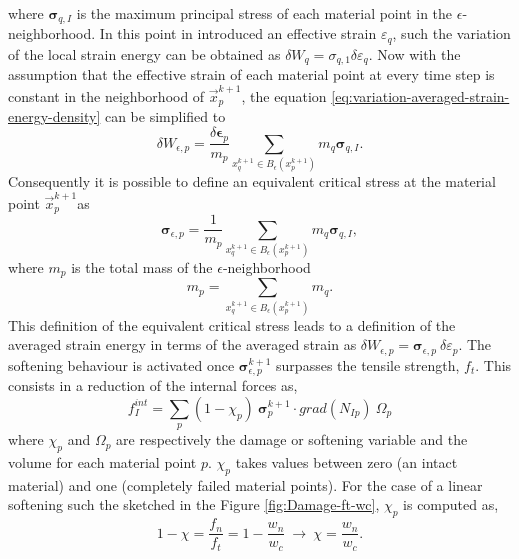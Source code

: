 \message{ !name(2020_EFM_MPM_Eigensoftening.tex)}\documentclass[preprint,12pt,a4paper]{elsarticle}
\newcommand{\tens}[1]{
  \ensuremath{\mathbf{{#1}}}
}
\newcommand\Grad[1]{grad({#1})}
\begin{document}
where $\tens{\sigma}_{q,I}$ is the maximum principal stress of each
material point in the $\epsilon$-neighborhood. In this point in
introduced an effective strain $\varepsilon_q$, such the variation of
the local strain energy can be obtained as $\delta W_q = \sigma_{q,1}
\delta\varepsilon_q$. Now with the assumption that the effective
strain of each material point at every time step is constant in the
neighborhood of $\vec{x}_p^{k+1}$, the equation 
\eqref{eq:variation-averaged-strain-energy-density} can be simplified
 to
\begin{equation}
  \label{eq:variation-averaged-strain-energy-density-simpli}
  \delta W_{\epsilon,p} =
  \frac{\delta \tens{\epsilon}_p}{m_p} \sum_{x_q^{k+1} \in
  B_{\epsilon}(x_p^{k+1})} m_q \tens{\sigma}_{q,I}. 
\end{equation}
Consequently it is possible to define an equivalent critical stress at the
material point $\vec{x}_p^{k+1}$as
\begin{equation}
  \label{eq:equivalent-critical-stress}
  \tens{\sigma}_{\epsilon,p} =
  \frac{1}{m_p} \sum_{x_q^{k+1} \in
  B_{\epsilon}(x_p^{k+1})} m_q \tens{\sigma}_{q,I}, 
\end{equation}
where $m_p$ is the total mass of the $\epsilon$-neighborhood
\begin{equation}
  \label{eq:averaged-mass}
  m_p = \sum_{x_q^{k+1} \in B_{\epsilon}(x_p^{k+1})} m_q.
\end{equation}
This definition of the equivalent critical stress leads to a
definition of the averaged strain energy in terms of the averaged
strain as $\delta W_{\epsilon,p} =
 \tens{\sigma}_{\epsilon,p}\ \delta\varepsilon_p$. The softening behaviour is
activated once $\tens{\sigma}_{\epsilon,p}^{k+1}$ surpasses the
tensile strength, $f_t$. This consists in a reduction of the internal
forces as,
 \begin{equation}
   \label{eq:f-int-damaged}
   f^{int}_I = \sum_p (1 - \chi_p)\ \tens{\sigma}_{p}^{k+1} \cdot
   \Grad{N_{Ip}}\ \Omega_p
 \end{equation}
where $\chi_p$ and $\Omega_p$ are respectively the damage or softening
variable and the volume for each material point $p$. $\chi_p$ takes
values between zero (an intact material) and one (completely failed
material points). For the case of a linear softening such the sketched in the Figure \ref{fig:Damage-ft-wc}, $\chi_p$ is computed as,
 \begin{equation}
   \label{eq:damaged-variable-chi}
   1 - \chi = \frac{f_n}{f_t} = 1 - \frac{w_n}{w_c}\ \rightarrow\ \chi
   = \frac{w_n}{w_c}.
 \end{equation}
\end{document}
